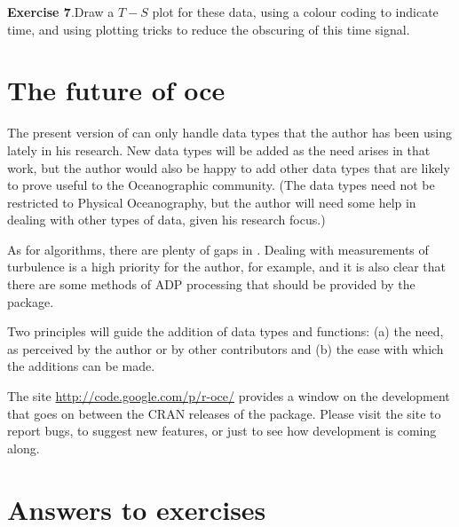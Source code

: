 \documentclass{article}
\newcommand{\workedexercise}[2]{
	\vspace{2ex plus 2ex minus 1ex}
	\begin{boxedminipage}[c]{0.95\linewidth}
		{\textbf{Exercise #1}.\hspace{1em}#2}
	\end{boxedminipage}
	\vspace{2ex plus 2ex minus 1ex}
}
\begin{document}
\workedexercise{7}{Draw a $T-S$ plot for these data, using a colour coding to indicate time,
and using plotting tricks to reduce the obscuring of this time signal.}


\section{The future of oce}

The present version of \verb@oce@ can only handle data types that the author has
been using lately in his research. New data types will be added as the need
arises in that work, but the author would also be happy to add other data types
that are likely to prove useful to the Oceanographic community.  (The data types
need not be restricted to Physical Oceanography, but the author will need some
help in dealing with other types of data, given his research focus.)

As for algorithms, there are plenty of gaps in \verb@oce@.  Dealing with
measurements of turbulence is a high priority for the author, for example, and
it is also clear that there are some methods of ADP processing that should be
provided by the package.

Two principles will guide the addition of data types and functions:
(a) the need, as perceived by the author or by other contributors and
(b) the ease with which the additions can be made.

The site \url{http://code.google.com/p/r-oce/} provides a window on the
development that goes on between the CRAN releases of the package. Please visit
the site to report bugs, to suggest new features, or just to see how \verb@oce@
development is coming along.

%
%
%
%
%

\goodbreak

\section*{Answers to exercises}
\end{document}
